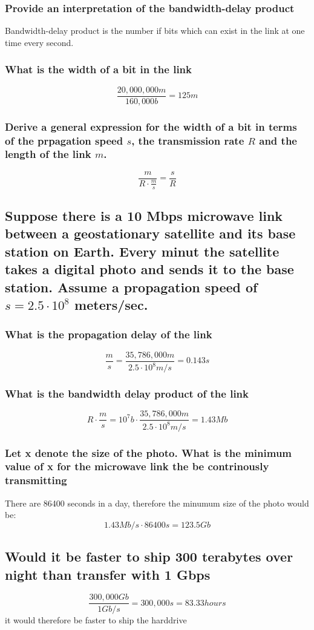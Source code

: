 \documentclass[12pt, a4paper]{article}
\begin{document}
			\subsubsection{Provide an interpretation of the bandwidth-delay product}
				Bandwidth-delay product is the number if bits which can exist in the link at one time every second.
			\subsubsection{What is the width of a bit in the link}
				$$\frac{20,000,000m}{160,000b}=125m$$
			\subsubsection{Derive a general expression for the width of a bit in terms of the prpagation speed $s$, the transmission rate $R$ and the length of the link $m$.}
				$$\frac{m}{R\cdot \frac{m}{s}}=\frac{s}{R}$$
		\subsection{Suppose there is a 10 Mbps microwave link between a geostationary satellite and its base station on Earth. Every minut the satellite takes a digital photo and sends it to the base station. Assume a propagation speed of $s=2.5\cdot 10^8$ meters/sec.}
			\subsubsection{What is the propagation delay of the link}
				$$\frac{m}{s}= \frac{35,786,000m}{2.5\cdot 10^8m/s}= 0.143s$$
			\subsubsection{What is the bandwidth delay product of the link}
				$$R\cdot \frac{m}{s}=10^7b\cdot \frac{35,786,000m}{2.5\cdot 10^8m/s}=1.43Mb$$
			\subsubsection{Let x denote the size of the photo. What is the minimum value of x for the microwave link the be contrinously transmitting}
				There are 86400 seconds in a day, therefore the minumum size of the photo would be:
				$$1.43Mb/s \cdot 86400s = 123.5Gb$$
		\subsection{Would it be faster to ship 300 terabytes over night than transfer with 1 Gbps}
			$$\frac{300,000Gb}{1Gb/s}=300,000s= 83.33 hours$$
			it would therefore be faster to ship the harddrive
\end{document}
